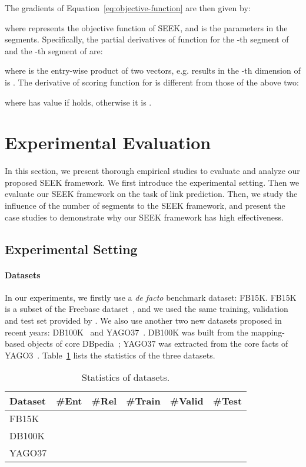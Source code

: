 \documentclass[11pt,a4paper]{article}
\newcommand{\TableSize}{\footnotesize} \renewcommand{\thefootnote}{\fnsymbol{footnote}}
\begin{document}
The gradients of Equation~\ref{eq:objective-function} are then given by:

where  represents the objective function of SEEK, and  is the parameters in the segments. Specifically, the partial derivatives of function  for the -th segment of  and the -th segment of  are:


where  is the entry-wise product of two vectors, e.g.  
results in the -th dimension of  is .
The derivative of scoring function  for  is different from those of the above two:

where  has value  if  holds, otherwise it is .
 \section{Experimental Evaluation}

\label{sec:exp}
In this section, we present thorough empirical studies to evaluate and analyze our proposed SEEK framework. 
We first introduce the experimental setting. Then we evaluate our SEEK framework on the task of link prediction. Then, we study the influence of the number of segments  to the SEEK framework, and present the case studies to demonstrate why our SEEK framework has high effectiveness.

\subsection{Experimental Setting}
\paragraph*{Datasets}
In our experiments, we firstly use a \textit{de facto} benchmark dataset: FB15K. FB15K is a subset of the Freebase dataset~\cite{bollacker2008freebase}, and we used the same training, validation and test set provided by \cite{bordes2013translating}. We also use another two new datasets proposed in recent years: DB100K~\cite{boyang2018:aer} and YAGO37~\cite{guo2018:RUGE}. DB100K was built from the mapping-based objects of core DBpedia~\cite{bizer2009dbpedia}; YAGO37 was extracted from the core facts of YAGO3~\cite{mahdisoltani2013yago3}. Table~\ref{tab:datasets} lists the statistics of the three datasets.

\begin{table}[!h]
	\centering
	\TableSize
	\begin{tabular}{ p{3.4em} | p{2.9em}  p{1.9em}  p{3em}  p{2.5em}  p{2.5em} }
		\toprule
		\textbf{Dataset} & \textbf{\#Ent} & \textbf{\#Rel} & \textbf{\#Train} & \textbf{\#Valid} & \textbf{\#Test} \\
		\midrule
		FB15K &  &  &  &  &   \\
		DB100K &  &   &   &   &   \\
		YAGO37 &  &  &  &  &  \\
		\bottomrule
	\end{tabular}
	\caption{Statistics of datasets.}
	\label{tab:datasets}
\end{table}
\end{document}
